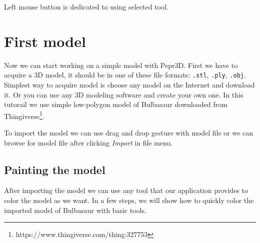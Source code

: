 Left mouse button is dedicated to using selected tool.

\section{First model}
Now we can start working on a simple model with Pepr3D. First we have to acquire a 3D model, it should be in one of these file formats: \texttt{.stl}, \texttt{.ply}, \texttt{.obj}. Simplest way to acquire model is choose any model on the Internet and download it. Or you can use any 3D modeling software and create your own one. In this tutorail we use simple low-polygon model of Bulbasaur downloaded from Thingiverse\footnote{https://www.thingiverse.com/thing:327753}.

To import the model we can use drag and drop gesture with model file or we can browse for model file after clicking \textit{Import} in file menu.


\subsection{Painting the model}

After importing the model we can use any tool that our application provides to color the model as we want. In a few steps, we will show how to quickly color the imported model of Bulbasaur with basic tools.


